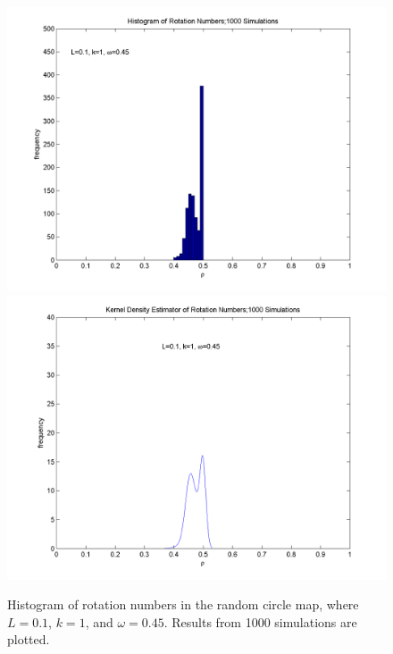 \begin{figure}[htp]
\caption[Histogram of rotation numbers in the random circle
map]{Histogram of rotation numbers in the random circle map, where
  $L=0.1$, $k=1$, and $\omega = 0.45$. Results from 1000 simulations
  are plotted.}
\centering
\includegraphics[width=.5\textwidth]{figs/hist_rho_k1_L01_om045.png}\hfill
\includegraphics[width=.5\textwidth]{figs/kde_rho_k1_L01_om045.png}
\end{figure}

